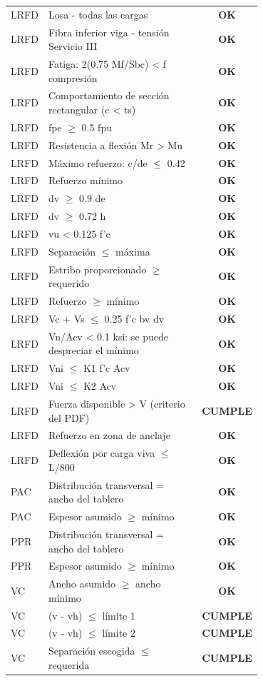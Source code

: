 \documentclass[10pt,a4paper]{article}
\newcommand{\ok}[1]{\textcolor{verde}{\textbf{#1}}}
\begin{document}
\begin{longtable}{@{}l p{0.7\linewidth} c@{}}
LRFD & Losa - todas las cargas & \ok{OK} \\
LRFD & Fibra inferior viga - tensión Servicio III & \ok{OK} \\
LRFD & Fatiga: 2(0.75 Mf/Sbc) < f compresión & \ok{OK} \\
LRFD & Comportamiento de sección rectangular (c < ts) & \ok{OK} \\
LRFD & fpe $\ge$ 0.5 fpu & \ok{OK} \\
LRFD & Resistencia a flexión Mr > Mu & \ok{OK} \\
LRFD & Máximo refuerzo: c/de $\le$ 0.42 & \ok{OK} \\
LRFD & Refuerzo mínimo & \ok{OK} \\
LRFD & dv $\ge$ 0.9 de & \ok{OK} \\
LRFD & dv $\ge$ 0.72 h & \ok{OK} \\
LRFD & vu < 0.125 f'c & \ok{OK} \\
LRFD & Separación $\le$ máxima & \ok{OK} \\
LRFD & Estribo proporcionado $\ge$ requerido & \ok{OK} \\
LRFD & Refuerzo $\ge$ mínimo & \ok{OK} \\
LRFD & Vc + Vs $\le$ 0.25 f'c bv dv & \ok{OK} \\
LRFD & Vn/Acv < 0.1 ksi: se puede despreciar el mínimo & \ok{OK} \\
LRFD & Vni $\le$ K1 f'c Acv & \ok{OK} \\
LRFD & Vni $\le$ K2 Acv & \ok{OK} \\
LRFD & Fuerza disponible > V (criterio del PDF) & \ok{CUMPLE} \\
LRFD & Refuerzo en zona de anclaje & \ok{OK} \\
LRFD & Deflexión por carga viva $\le$ L/800 & \ok{OK} \\
PAC & Distribución transversal = ancho del tablero & \ok{OK} \\
PAC & Espesor asumido $\ge$ mínimo & \ok{OK} \\
PPR & Distribución transversal = ancho del tablero & \ok{OK} \\
PPR & Espesor asumido $\ge$ mínimo & \ok{OK} \\
VC & Ancho asumido $\ge$ ancho mínimo & \ok{OK} \\
VC & (v - vh) $\le$ límite 1 & \ok{CUMPLE} \\
VC & (v - vh) $\le$ límite 2 & \ok{CUMPLE} \\
VC & Separación escogida $\le$ requerida & \ok{CUMPLE} \\

\end{longtable}
\end{document}
